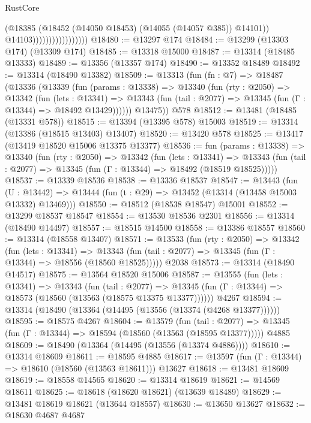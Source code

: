 \begin{lexlean}{RustCore}
\begin{coremodule}
                                      (@18385
                                        (@18452 (@14050 @18453) (@14055 (@14057 @385)) @14101))
                                      @14103)))))))))))))))))
@18480 := @13297 @174
@18484 := @13299 (@13303 @174) (@13309 @174)
@18485 := @13318 @15000
@18487 := @13314 (@18485 @13333)
@18489 := @13356 (@13357 @174)
@18490 := @13352 @18489
@18492 := @13314 (@18490 @13382)
@18509 := @13313
    (fun (fn : @7) =>
    @18487
      (@13336
        (@13339
          (fun (params : @13338) =>
          @13340
            (fun (rty : @2050) =>
            @13342
              (fun (lets : @13341) =>
              @13343 (fun (tail : @2077) => @13345 (fun (Γ : @13344) => @18492 @13429))))))
        @13475))
    @578
@18512 := @13481 (@18485 (@13331 @578))
@18515 := @13394 (@13395 @578) @15003
@18519 := @13314 (@13386 (@18515 @13403) @13407)
@18520 := @13420 @578
@18525 := @13417 (@13419 @18520 @15006 @13375 @13377)
@18536 := fun (params : @13338) =>
  @13340
    (fun (rty : @2050) =>
    @13342
      (fun (lets : @13341) =>
      @13343 (fun (tail : @2077) => @13345 (fun (Γ : @13344) => @18492 (@18519 @18525)))))
@18537 := @13339 @18536
@18538 := @13336 @18537
@18547 := @13443
    (fun (U : @13442) => @13444 (fun (t : @29) => @13452 (@13314 (@13458 @15003 @13332) @13469)))
@18550 := @18512 (@18538 @18547) @15001
@18552 := @13299 @18537 @18547
@18554 := @13530 @18536 @2301
@18556 := @13314 (@18490 @14497)
@18557 := @18515 @14500
@18558 := @13386 @18557
@18560 := @13314 (@18558 @13407)
@18571 := @13533
    (fun (rty : @2050) =>
    @13342
      (fun (lets : @13341) =>
      @13343 (fun (tail : @2077) => @13345 (fun (Γ : @13344) => @18556 (@18560 @18525)))))
    @2038
@18573 := @13314 (@18490 @14517)
@18575 := @13564 @18520 @15006
@18587 := @13555
    (fun (lets : @13341) =>
    @13343
      (fun (tail : @2077) =>
      @13345 (fun (Γ : @13344) => @18573 (@18560 (@13563 (@18575 @13375 @13377))))))
    @4267
@18594 := @13314 (@18490 (@13364 (@14495 (@13556 (@13374 (@4268 @13377))))))
@18595 := @18575 @4267
@18604 := @13579
    (fun (tail : @2077) => @13345 (fun (Γ : @13344) => @18594 (@18560 (@13563 (@18595 @13377)))))
    @4885
@18609 := @18490 (@13364 (@14495 (@13556 (@13374 @4886))))
@18610 := @13314 @18609
@18611 := @18595 @4885
@18617 := @13597 (fun (Γ : @13344) => @18610 (@18560 (@13563 @18611))) @13627
@18618 := @13481 @18609
@18619 := @18558 @14565
@18620 := @13314 @18619
@18621 := @14569 @18611
@18625 := @18618 (@18620 @18621) (@13639 @18489)
@18629 := @13481 @18619 @18621 (@13644 @18557)
@18630 := @13650 @13627
@18632 := @18630 @4687 @4687

\end{coremodule}
\end{lexlean}
